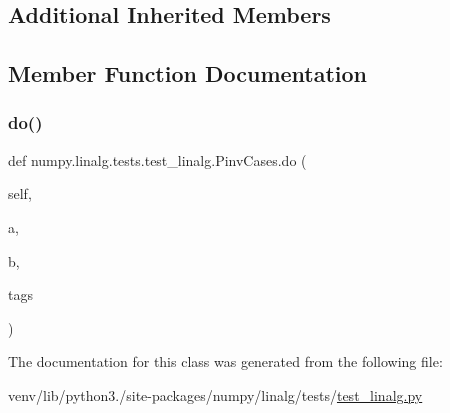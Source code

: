 \subsection*{Additional Inherited Members}


\subsection{Member Function Documentation}
\mbox{\label{classnumpy_1_1linalg_1_1tests_1_1test__linalg_1_1PinvCases_a89344c40e5edd15282b994b451ccf34e}} 
\subsubsection{\texorpdfstring{do()}{do()}}
{\footnotesize\ttfamily def numpy.\+linalg.\+tests.\+test\+\_\+linalg.\+Pinv\+Cases.\+do (\begin{DoxyParamCaption}\item[{}]{self,  }\item[{}]{a,  }\item[{}]{b,  }\item[{}]{tags }\end{DoxyParamCaption})}



The documentation for this class was generated from the following file\+:\begin{DoxyCompactItemize}
\item 
venv/lib/python3./site-\/packages/numpy/linalg/tests/\hyperlink{test__linalg_8py}{test\+\_\+linalg.\+py}\end{DoxyCompactItemize}
